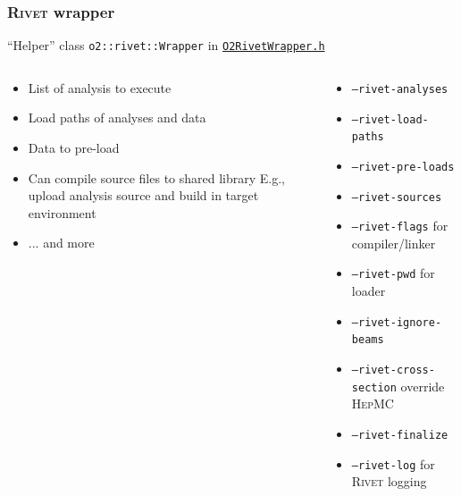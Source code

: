 \documentclass[compress,table,8pt]{beamer}
\newcommand\Rivet{{\scshape Rivet}}
\newcommand\HepMC{{\scshape HepMC}}
\begin{document}
\begin{frame}
  \frametitle{\Rivet{} wrapper}

  ``Helper'' class \texttt{o2::rivet::Wrapper} in
  \href{https://gitlab.com/cholmcc/O2Rivet/-/blob/master/O2RivetWrapper.h}{\texttt{O2RivetWrapper.h}}

  \begin{columns}[onlytextwidth,t]
    \begin{column}{.45\linewidth}
      \begin{itemize}
      \item<+-> List of analysis to execute
      \item<+-> Load paths of analyses and data
      \item<+-> Data to pre-load
      \item<+-> Can compile source files to shared library \newline
        {\footnotesize E.g., upload analysis source and build in
          target environment}
      \item<+-> ... and more
      \end{itemize}
    \end{column}
    \begin{column}{.45\linewidth}
      \begin{itemize}
      \item<1-> \texttt{--rivet-analyses}
      \item<2-> \texttt{--rivet-load-paths}
      \item<3-> \texttt{--rivet-pre-loads}
      \item<4-> \texttt{--rivet-sources}
      \item<5-> \texttt{--rivet-flags} for compiler/linker
      \item<5-> \texttt{--rivet-pwd} for loader
      \item<5-> \texttt{--rivet-ignore-beams}
      \item<5-> \texttt{--rivet-cross-section} override \HepMC{}
      \item<5-> \texttt{--rivet-finalize}
      \item<5-> \texttt{--rivet-log} for \Rivet{} logging
      \end{itemize}
    \end{column}
  \end{columns}
\end{frame}
\end{document}
